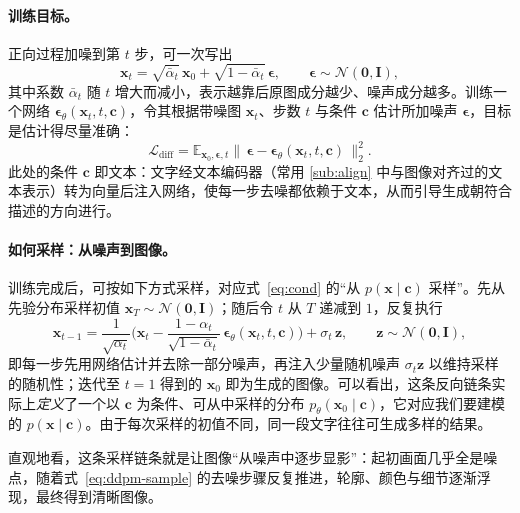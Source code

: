 \paragraph{训练目标。}正向过程加噪到第 $t$ 步，可一次写出
\begin{equation}
  \mathbf{x}_t=\sqrt{\bar\alpha_t}\,\mathbf{x}_0+\sqrt{1-\bar\alpha_t}\,\boldsymbol{\epsilon},\qquad \boldsymbol{\epsilon}\sim\mathcal{N}(\mathbf{0},\mathbf{I}),
\end{equation}
其中系数 $\bar\alpha_t$ 随 $t$ 增大而减小，表示越靠后原图成分越少、噪声成分越多。训练一个网络 $\boldsymbol{\epsilon}_\theta(\mathbf{x}_t,t,\mathbf{c})$，令其根据带噪图 $\mathbf{x}_t$、步数 $t$ 与条件 $\mathbf{c}$ 估计所加噪声 $\boldsymbol{\epsilon}$，目标是估计得尽量准确：
\begin{equation}
  \mathcal{L}_{\text{diff}}=\mathbb{E}_{\mathbf{x}_0,\boldsymbol{\epsilon},t}\big\lVert\,\boldsymbol{\epsilon}-\boldsymbol{\epsilon}_\theta(\mathbf{x}_t,t,\mathbf{c})\,\big\rVert_2^2 .
\end{equation}
此处的条件 $\mathbf{c}$ 即文本：文字经文本编码器（常用 \ref{sub:align} 中与图像对齐过的文本表示）转为向量后注入网络，使每一步去噪都依赖于文本，从而引导生成朝符合描述的方向进行。

\paragraph{如何采样：从噪声到图像。}训练完成后，可按如下方式采样，对应式~\eqref{eq:cond} 的“从 $p(\mathbf{x}\mid\mathbf{c})$ 采样”。先从先验分布采样初值 $\mathbf{x}_T\sim\mathcal{N}(\mathbf{0},\mathbf{I})$；随后令 $t$ 从 $T$ 递减到 $1$，反复执行
\begin{equation}
  \mathbf{x}_{t-1}=\frac{1}{\sqrt{\alpha_t}}\Big(\mathbf{x}_t-\frac{1-\alpha_t}{\sqrt{1-\bar\alpha_t}}\,\boldsymbol{\epsilon}_\theta(\mathbf{x}_t,t,\mathbf{c})\Big)+\sigma_t\,\mathbf{z},\qquad \mathbf{z}\sim\mathcal{N}(\mathbf{0},\mathbf{I}),
  \label{eq:ddpm-sample}
\end{equation}
即每一步先用网络估计并去除一部分噪声，再注入少量随机噪声 $\sigma_t\mathbf{z}$ 以维持采样的随机性；迭代至 $t=1$ 得到的 $\mathbf{x}_0$ 即为生成的图像。可以看出，这条反向链条实际上\emph{定义}了一个以 $\mathbf{c}$ 为条件、可从中采样的分布 $p_\theta(\mathbf{x}_0\mid\mathbf{c})$，它对应我们要建模的 $p(\mathbf{x}\mid\mathbf{c})$。由于每次采样的初值不同，同一段文字往往可生成多样的结果。

直观地看，这条采样链条就是让图像“从噪声中逐步显影”：起初画面几乎全是噪点，随着式~\eqref{eq:ddpm-sample} 的去噪步骤反复推进，轮廓、颜色与细节逐渐浮现，最终得到清晰图像。

